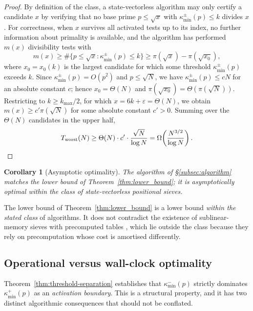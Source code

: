 \documentclass[11pt]{amsart}
\numberwithin{equation}{section}
\newcommand{\kminp}{\kappa_{\min}^{+}}
\newcommand{\kminm}{\kappa_{\min}^{-}}
\theoremstyle{plain}
\newtheorem{corollary}[theorem]{Corollary}
\theoremstyle{definition}
\begin{document}
\begin{proof}
By definition of the class, a state-vectorless algorithm may only
certify a candidate $x$ by verifying that no base prime $p\le\sqrt{x}$
with $\kappa_{\min}^{\pm}(p)\le k$ divides $x$. For correctness, when
$x$ survives all activated tests up to its index, no further
information about primality is available, and the algorithm has
performed $m(x)$ divisibility tests with
\begin{equation*}
m(x)\ge\#\{p\le\sqrt{x}:\kappa_{\min}^{\pm}(p)\le k\}
\ge\pi(\sqrt{x})-\pi(\sqrt{x_0}),
\end{equation*}
where $x_0=x_0(k)$ is the largest candidate for which some threshold
$\kappa_{\min}^{\pm}(p)$ exceeds $k$. Since
$\kappa_{\min}^{\pm}(p)=O(p^2)$ and $p\le\sqrt{N}$, we have
$\kappa_{\min}^{\pm}(p)\le cN$ for an absolute constant $c$; hence
$x_0=\Theta(N)$ and $\pi(\sqrt{x_0})=\Theta(\pi(\sqrt{N}))$.
Restricting to $k\ge k_{\max}/2$, for which
$x=6k+\varepsilon=\Theta(N)$, we obtain
$m(x)\ge c'\pi(\sqrt{N})$ for some absolute constant $c'>0$. Summing
over the $\Theta(N)$ candidates in the upper half,
\begin{equation*}
T_{\mathrm{worst}}(N)\ge
\Theta(N)\cdot c'\cdot\frac{\sqrt{N}}{\log N}
=\Omega\!\left(\frac{N^{3/2}}{\log N}\right).\qedhere
\end{equation*}
\end{proof}

\begin{corollary}[Asymptotic optimality]
\label{cor:asymptotic-optimal}
The algorithm of \S\ref{subsec:algorithm} matches the lower bound of
Theorem~\ref{thm:lower_bound}; it is asymptotically optimal within the
class of state-vectorless positional sieves.
\end{corollary}

The lower bound of Theorem~\ref{thm:lower_bound} is a lower bound
\emph{within the stated class} of algorithms. It does not contradict
the existence of sublinear-memory sieves with precomputed tables
\cite{OliveiraeSilva2006,Galway2004}, which lie outside the class
because they rely on precomputation whose cost is amortised
differently.

\subsection{Operational versus wall-clock optimality}
\label{subsec:complexity-operational}

Theorem~\ref{thm:threshold-separation} establishes that $\kminm(p)$
strictly dominates $\kminp(p)$ as an \emph{activation boundary}. This
is a structural property, and it has two distinct algorithmic
consequences that should not be conflated.
\end{document}
